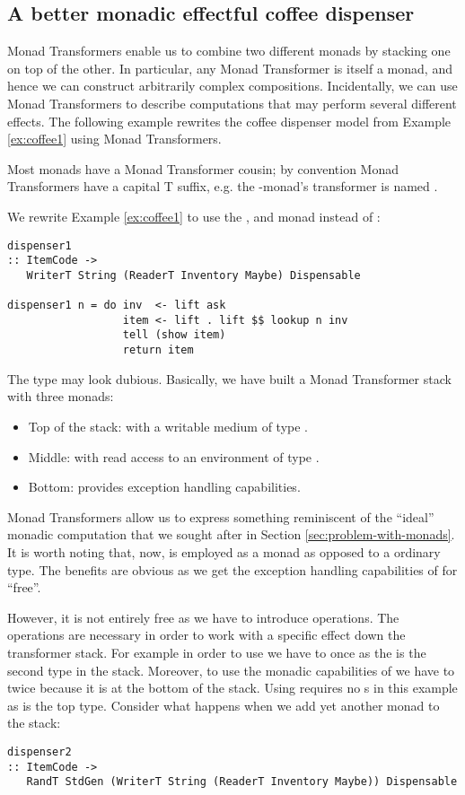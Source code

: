 \subsection{A better monadic effectful coffee dispenser}\label{sec:mt}
Monad Transformers enable us to combine two different monads by stacking one on top of the other.
In particular, any Monad Transformer is itself a monad, and hence we can construct arbitrarily complex compositions.
Incidentally, we can use Monad Transformers to describe computations that may perform several different effects.
The following example rewrites the coffee dispenser model from Example \ref{ex:coffee1} using Monad Transformers.
\begin{example}\label{ex:coffee2}
Most monads have a Monad Transformer cousin; by convention Monad Transformers have a capital T suffix, e.g. the -monad's transformer is named .

We rewrite Example \ref{ex:coffee1} to use the , and  monad instead of :
\begin{lstlisting}[style={haskell}]
dispenser1 
:: ItemCode -> 
   WriterT String (ReaderT Inventory Maybe) Dispensable

dispenser1 n = do inv  <- lift ask
                  item <- lift . lift $$ lookup n inv
                  tell (show item)
                  return item
\end{lstlisting}
The type may look dubious. Basically, we have built a Monad Transformer stack with three monads:
\begin{itemize}
  \item Top of the stack:  with a writable medium of type .
  \item Middle:  with read access to an environment of type .
  \item Bottom:  provides exception handling capabilities.
\end{itemize}
Monad Transformers allow us to express something reminiscent of the ``ideal'' monadic computation that we sought after in Section \ref{sec:problem-with-monads}. It is worth noting that, now,   is employed as a monad as opposed to a ordinary type. The benefits are obvious as we get the exception handling capabilities of  for ``free''.

However, it is not entirely free as we have to introduce  operations. The  operations are necessary in order to work with a specific effect down the transformer stack. For example in order to use  we have to  once as the  is the second type in the stack. Moreover, to use the monadic capabilities of  we have to  twice because it is at the bottom of the stack. Using  requires no s in this example as  is the top type. 
Consider what happens when we add yet another monad to the stack:
\begin{lstlisting}[style={haskell}]
dispenser2 
:: ItemCode -> 
   RandT StdGen (WriterT String (ReaderT Inventory Maybe)) Dispensable


\end{lstlisting}
\end{example}

